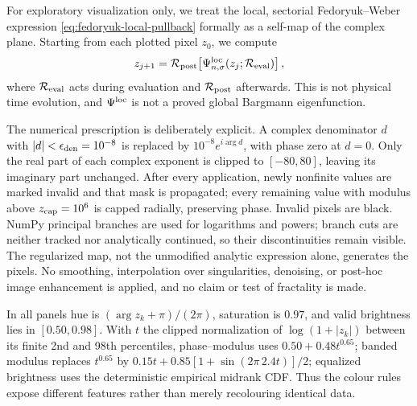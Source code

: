 \documentclass[11pt]{article}
\theoremstyle{remark}
\begin{document}
For exploratory visualization only, we treat the local, sectorial
Fedoryuk--Weber expression \eqref{eq:fedoryuk-local-pullback} formally as a
self-map of the complex plane.  Starting from each plotted pixel $z_0$, we
compute
\begin{equation}
 z_{j+1}=\mathcal R_{\rm post}\!\left[
  \Psi_{n,\sigma}^{\rm loc}(z_j;\mathcal R_{\rm eval})\right],
 \label{eq:regularized-local-iteration}
\end{equation}
where \(\mathcal R_{\rm eval}\) acts during evaluation and
\(\mathcal R_{\rm post}\) afterwards.  This is not physical time evolution,
and \(\Psi^{\rm loc}\) is not a proved global Bargmann eigenfunction.

The numerical prescription is deliberately explicit.  A complex denominator
\(d\) with \(|d|<\epsilon_{\rm den}=10^{-8}\) is replaced by
\(10^{-8}e^{i\arg d}\), with phase zero at \(d=0\).  Only the real part of
each complex exponent is clipped to \([-80,80]\), leaving its imaginary part
unchanged.  After every application, newly nonfinite values are marked invalid
and that mask is propagated; every remaining value with modulus above
\(z_{\rm cap}=10^6\) is capped radially, preserving phase.  Invalid pixels
are black.  NumPy principal branches are used for logarithms and powers;
branch cuts are neither tracked nor analytically continued, so their
discontinuities remain visible.  The regularized map, not the unmodified
analytic expression alone, generates the pixels.  No smoothing, interpolation
over singularities, denoising, or post-hoc image enhancement is applied, and
no claim or test of fractality is made.

In all panels hue is \((\arg z_k+\pi)/(2\pi)\), saturation is \(0.97\), and
valid brightness lies in \([0.50,0.98]\).  With
\(t\) the clipped normalization of \(\log(1+|z_k|)\) between its finite
2nd and 98th percentiles, phase--modulus uses
\(0.50+0.48t^{0.65}\); banded modulus replaces \(t^{0.65}\) by
\(0.15t+0.85[1+\sin(2\pi\,2.4t)]/2\); equalized brightness uses the
deterministic empirical midrank CDF.  Thus the colour rules expose different
features rather than merely recolouring identical data.
\end{document}
